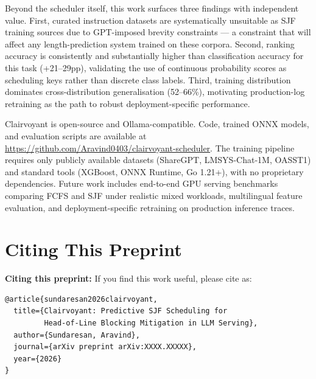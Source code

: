 \documentclass[10pt,letterpaper]{article}
\begin{document}
Beyond the scheduler itself, this work surfaces three findings with independent value. First, curated instruction datasets are systematically unsuitable as SJF training sources due to GPT-imposed brevity constraints --- a constraint that will affect any length-prediction system trained on these corpora. Second, ranking accuracy is consistently and substantially higher than classification accuracy for this task (+21--29pp), validating the use of continuous probability scores as scheduling keys rather than discrete class labels. Third, training distribution dominates cross-distribution generalisation (52--66\%), motivating production-log retraining as the path to robust deployment-specific performance.

Clairvoyant is open-source and Ollama-compatible. Code, trained ONNX models, and evaluation scripts are available at \url{https://github.com/Aravind0403/clairvoyant-scheduler}. The training pipeline requires only publicly available datasets (ShareGPT, LMSYS-Chat-1M, OASST1) and standard tools (XGBoost, ONNX Runtime, Go 1.21+), with no proprietary dependencies. Future work includes end-to-end GPU serving benchmarks comparing FCFS and SJF under realistic mixed workloads, multilingual feature evaluation, and deployment-specific retraining on production inference traces.

\section*{Citing This Preprint}

\noindent\textbf{Citing this preprint:}
If you find this work useful, please cite as:
\begin{verbatim}
@article{sundaresan2026clairvoyant,
  title={Clairvoyant: Predictive SJF Scheduling for
         Head-of-Line Blocking Mitigation in LLM Serving},
  author={Sundaresan, Aravind},
  journal={arXiv preprint arXiv:XXXX.XXXXX},
  year={2026}
}
\end{verbatim}
\end{document}
